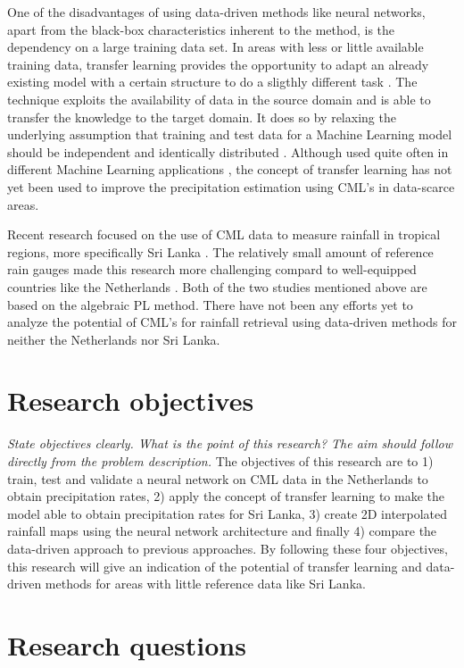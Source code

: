 \documentclass[twocolumn, 10pt, a4paper]{article}
\begin{document}
	One of the disadvantages of using data-driven methods like neural networks, apart from the black-box characteristics inherent to the method, is the dependency on a large training data set. In areas with less or little available training data, transfer learning provides the opportunity to adapt an already existing model with a certain structure to do a sligthly different task \cite{TanYear}. The technique exploits the availability of data in the source domain and is able to transfer the knowledge to the target domain. It does so by relaxing the underlying assumption that training and test data for a Machine Learning model should be independent and identically distributed \cite{Weiss2016}. Although used quite often in different Machine Learning applications \cite{Zhuang2021}, the concept of transfer learning has not yet been used to improve the precipitation estimation using CML's in data-scarce areas. 
	
	Recent research focused on the use of CML data to measure rainfall in tropical regions, more specifically Sri Lanka \cite{Overeem2021}. The relatively small amount of reference rain gauges made this research more challenging compard to well-equipped countries like the Netherlands \cite{Overeem2013}. Both of the two studies mentioned above are based on the algebraic PL method. There have not been any efforts yet to analyze the potential of CML's for rainfall retrieval using data-driven methods for neither the Netherlands nor Sri Lanka. 

	
	\section{Research objectives}
	
	\textit{State objectives clearly. What is the point of this research? The aim should follow directly from the problem description.}
	The objectives of this research are to 1) train, test and validate a neural network on CML data in the Netherlands to obtain precipitation rates, 2) apply the concept of transfer learning to make the model able to obtain precipitation rates for Sri Lanka, 3) create 2D interpolated rainfall maps using the neural network architecture and finally 4) compare the data-driven approach to previous approaches. By following these four objectives, this research will give an indication of the potential of transfer learning and data-driven methods for areas with little reference data like Sri Lanka. 
	 
	
	\section{Research questions}
	
\end{document}
